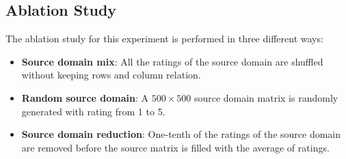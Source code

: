 \clearpage


\subsection{Ablation Study}

The ablation study for this experiment is performed in three different ways:
\begin{itemize}
\item \textbf{Source domain mix}: All the ratings of the source domain are shuffled without keeping rows and column relation.
\item \textbf{Random source domain}: A $500 \times 500$ source domain matrix is randomly generated with rating from 1 to 5.
\item \textbf{Source domain reduction}: One-tenth of the ratings of the source domain are removed before the source matrix is filled with the average of ratings.
\end{itemize}

